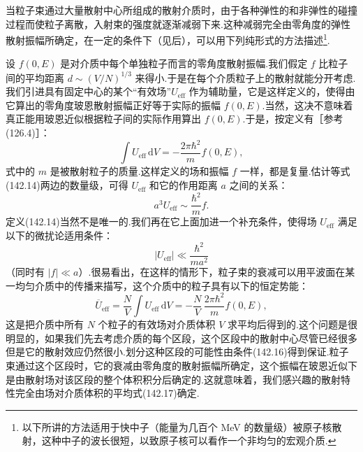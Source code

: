 当粒子束通过大量散射中心所组成的散射介质时，由于各种弹性的和非弹性的碰撞过程而使粒子离散，入射束的强度就逐渐减弱下来.这种减弱完全由零角度的弹性散射振幅所确定，在一定的条件下（见后），可以用下列纯形式的方法描述\footnote{以下所讲的方法适用于快中子（能量为几百个 MeV 的数量级）被原子核散射，这种中子的波长很短，以致原子核可以看作一个非均匀的宏观介质.}.

设 $f(0,E)$ 是对介质中每个单独粒子而言的零角度散射振幅.我们假定 $f$ 比粒子间的平均距离 $d\sim(V/N)^{1/3}$ 来得小.于是在每个介质粒子上的散射就能分开考虑.我们引进具有固定中心的某个“有效场”$U_{\mathrm{eff}}$ 作为辅助量，它是这样定义的，使得由它算出的零角度玻恩散射振幅正好等于实际的振幅 $f(0,E)$.当然，这决不意味着真正能用玻恩近似根据粒子间的实际作用算出 $f(0,E)$.于是，按定义有［参考(126.4)］：
\begin{equation}
  \int U_{\mathrm{eff}}\,\mathrm{d}V=-\frac{2\pi\hbar^2}{m}f(0,E),
\end{equation}
式中的 $m$ 是被散射粒子的质量.这样定义的场和振幅 $f$ 一样，都是复量.估计等式(142.14)两边的数量级，可得 $U_{\mathrm{eff}}$ 和它的作用距离 $a$ 之间的关系：
\begin{equation}
  a^3U_{\mathrm{eff}}\sim\frac{\hbar^2}{m}f.
\end{equation}
定义(142.14)当然不是唯一的.我们再在它上面加进一个补充条件，使得场 $U_{\mathrm{eff}}$ 满足以下的微扰论适用条件：
\begin{equation}
  |U_{\mathrm{eff}}|\ll\frac{\hbar^2}{ma^2}
\end{equation}
（同时有 $|f|\ll a$）.很易看出，在这样的情形下，粒子束的衰减可以用平波面在某一均匀介质中的传播来描写，这个介质中的粒子具有以下的恒定势能：
\begin{equation}
  \overline{U}_{\mathrm{eff}}=\frac{N}{V}\int U_{\mathrm{eff}}\,\mathrm{d}V
  =-\frac{N}{V}\,\frac{2\pi\hbar^2}{m}f(0,E),
\end{equation}
这是把介质中所有 $N$ 个粒子的有效场对介质体积 $V$ 求平均后得到的.这个问题是很明显的，如果我们先去考虑介质的每个区段，这个区段中的散射中心尽管已经很多但是它的散射效应仍然很小.划分这种区段的可能性由条件(142.16)得到保证.粒子束通过这个区段时，它的衰减由零角度的散射振幅所确定，这个振幅在玻恩近似下是由散射场对该区段的整个体积积分后确定的.这就意味着，我们感兴趣的散射特性完全由场对介质体积的平均式(142.17)确定.

